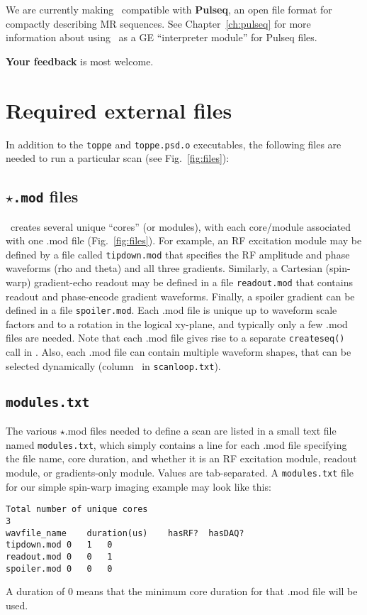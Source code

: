 We are currently making \toppe~compatible with {\bf Pulseq}, an open file format for compactly describing MR sequences.
See Chapter~\ref{ch:pulseq} for more information about using \toppe~as a GE ``interpreter module'' for Pulseq files.

\textbf{Your feedback} is most welcome. 


\section{Required external files}
In addition to the {\tt toppe} and {\tt toppe.psd.o} executables, the following files are needed to run a particular scan (see Fig.~\ref{fig:files}):

\subsection{ {\tt $\star$.mod} files}
\toppe~creates several unique ``cores'' (or modules), with each core/module associated with one .mod file (Fig.~\ref{fig:files}).
For example, an RF excitation module may be defined by a file called {\tt tipdown.mod} that specifies the RF amplitude and phase waveforms (rho and theta) and all three gradients.
Similarly, a Cartesian (spin-warp) gradient-echo readout may be defined in a file {\tt readout.mod} that contains readout and phase-encode gradient waveforms.
Finally, a spoiler gradient can be defined in a file {\tt spoiler.mod}.
Each .mod file is unique up to waveform scale factors and to a rotation in the logical xy-plane, and typically only a few .mod files are needed.
Note that each .mod file gives rise to a separate {\tt createseq()} call in \toppe.
Also, each .mod file can contain multiple waveform shapes, that can be selected dynamically (column \waveformnum~in {\tt scanloop.txt}).

\subsection{\tt modules.txt}
The various $\star$.mod files needed to define a scan are listed in a small text file named {\tt modules.txt}, which simply contains a line for each .mod file specifying the file name, core duration, and whether it is an RF excitation module, readout module, or gradients-only module.
Values are tab-separated.
A {\tt modules.txt} file for our simple spin-warp imaging example may look like this:
\begin{lstlisting}
Total number of unique cores
3
wavfile_name	duration(us)	hasRF?	hasDAQ?
tipdown.mod	0	1	0
readout.mod	0	0	1
spoiler.mod	0	0	0
\end{lstlisting}
A duration of 0 means that the minimum core duration for that .mod file will be used.

